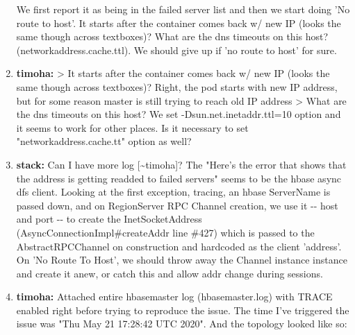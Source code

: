 \documentclass{report}%
\begin{document}
\begin{enumerate}
We first report it as being in the failed server list and then we start doing  'No route to host'. It starts after the container comes back w/ new IP (looks the same though across textboxes)? What are the dns timeouts on this host? (networkaddress.cache.ttl). We should give up if 'no route to host' for sure.%
\item%
\textbf{timoha: }> It starts after the container comes back w/ new IP (looks the same though across textboxes)?\newline%
\newline%
\newline%
\newline%
Right, the pod starts with new IP address, but for some reason master is still trying to reach old IP address\newline%
\newline%
\newline%
\newline%
\newline%
\newline%
\newline%
\newline%
> What are the dns timeouts on this host?\newline%
\newline%
\newline%
\newline%
We set {-}Dsun.net.inetaddr.ttl=10 option and it seems to work for other places. Is it necessary to set "networkaddress.cache.tt" option as well?%
\item%
\textbf{stack: }Can I have more log {[}\textasciitilde{}timoha{]}? The "Here's the error that shows that the address is getting readded to failed servers" seems to be the hbase async dfs client. Looking at the first exception, tracing, an hbase ServerName is passed down, and on RegionServer RPC Channel creation, we use it {-}{-} host and port {-}{-} to create the InetSocketAddress (AsyncConnectionImpl\#createAddr line \#427) which is passed to the AbstractRPCChannel on construction and hardcoded as the client 'address'. On 'No Route To Host', we should throw away the Channel instance instance and create it anew, or catch this and allow addr change during sessions.\newline%
\newline%
\newline%
\newline%
%
\item%
\textbf{timoha: }Attached entire hbasemaster log (hbasemaster.log) with TRACE enabled right before trying to reproduce the issue.\newline%
\newline%
\newline%
\newline%
The time I've triggered the issue was "Thu May 21 17:28:42 UTC 2020". And the topology looked like so:\newline%
\newline%
\begin{spverbatim}


\end{spverbatim}
\end{enumerate}
\end{document}
